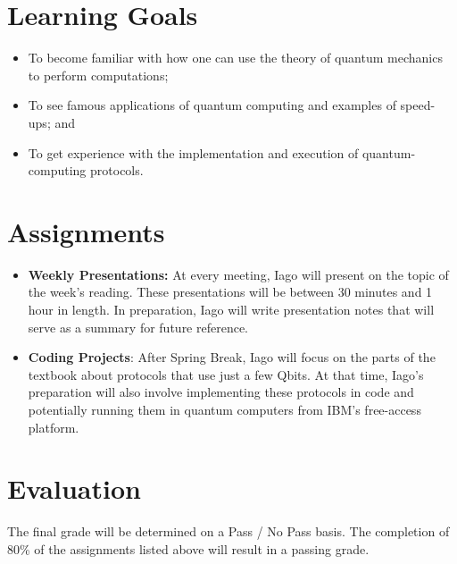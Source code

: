\documentclass{../doc}
\begin{document}
  \section*{Learning Goals}
    \begin{itemize}
      \item To become familiar with how one can use the theory of quantum mechanics to perform computations;
      \item To see famous applications of quantum computing and examples of speed-ups; and
      \item To get experience with the implementation and execution of quantum-computing protocols.
    \end{itemize}

  \section*{Assignments}
    \begin{itemize}
      \item {\bf Weekly Presentations:} At every meeting, Iago will present on the topic of the week's reading. These presentations will be between 30 minutes and 1 hour in length. In preparation, Iago will write presentation notes that will serve as a summary for future reference.
      \item {\bf Coding Projects}: After Spring Break, Iago will focus on the parts of the textbook about protocols that use just a few Qbits. At that time, Iago's preparation will also involve implementing these protocols in code and potentially running them in quantum computers from IBM's free-access platform.
    \end{itemize}

  \section*{Evaluation}
    The final grade will be determined on a Pass / No Pass basis. The completion of 80\% of the assignments listed above will result in a passing grade.
\end{document}
